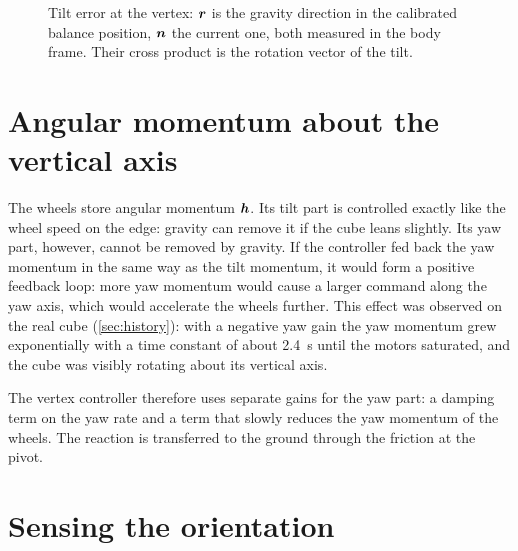 \begin{figure}[htbp]
  \centering
  \caption{Tilt error at the vertex: $\bm{r}$ is the gravity direction in the calibrated
    balance position, $\bm{n}$ the current one, both measured in the body frame. Their cross
    product is the rotation vector of the tilt.}
  \label{fig:vertex_vectors}
\end{figure}

\section{Angular momentum about the vertical axis}
\label{sec:yaw_physics}

The wheels store angular momentum $\bm{h}$. Its tilt part is controlled exactly like the wheel
speed on the edge: gravity can remove it if the cube leans slightly. Its yaw part, however, cannot
be removed by gravity. If the controller fed back the yaw momentum in the same way as the tilt
momentum, it would form a positive feedback loop: more yaw momentum would cause a larger command
along the yaw axis, which would accelerate the wheels further. This effect was observed on the
real cube (\cref{sec:history}): with a negative yaw gain the yaw momentum grew exponentially with a
time constant of about \SI{2.4}{s} until the motors saturated, and the cube was visibly rotating
about its vertical axis.

The vertex controller therefore uses separate gains for the yaw part: a damping term on the yaw
rate and a term that slowly reduces the yaw momentum of the wheels. The reaction is transferred
to the ground through the friction at the pivot.

\section{Sensing the orientation}

